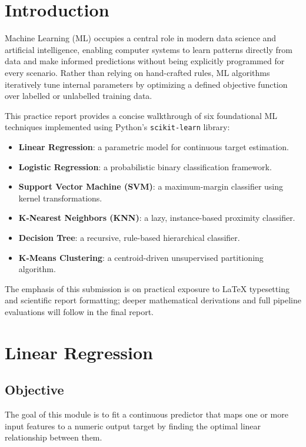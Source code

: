\documentclass[12pt]{article}
\begin{document}
\tableofcontents
\newpage

\section{Introduction}

Machine Learning (ML) occupies a central role in modern data science and artificial intelligence, enabling computer systems to learn patterns directly from data and make informed predictions without being explicitly programmed for every scenario. Rather than relying on hand-crafted rules, ML algorithms iteratively tune internal parameters by optimizing a defined objective function over labelled or unlabelled training data.

This practice report provides a concise walkthrough of six foundational ML techniques implemented using Python's \texttt{scikit-learn} library:

\begin{itemize}[leftmargin=2em, itemsep=4pt]
    \item \textbf{Linear Regression}: a parametric model for continuous target estimation.
    \item \textbf{Logistic Regression}: a probabilistic binary classification framework.
    \item \textbf{Support Vector Machine (SVM)}: a maximum-margin classifier using kernel transformations.
    \item \textbf{K-Nearest Neighbors (KNN)}: a lazy, instance-based proximity classifier.
    \item \textbf{Decision Tree}: a recursive, rule-based hierarchical classifier.
    \item \textbf{K-Means Clustering}: a centroid-driven unsupervised partitioning algorithm.
\end{itemize}

The emphasis of this submission is on practical exposure to LaTeX typesetting and scientific report formatting; deeper mathematical derivations and full pipeline evaluations will follow in the final report.

\section{Linear Regression}

\subsection{Objective}
The goal of this module is to fit a continuous predictor that maps one or more input features to a numeric output target by finding the optimal linear relationship between them.
\end{document}
